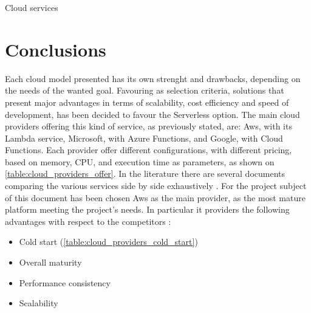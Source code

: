 \begin{chapter}{Cloud services}
    \section{Conclusions}
    Each cloud model presented has its own strenght and drawbacks, depending on the
    needs of the wanted goal. Favouring as selection criteria, solutions that present
    major advantages in terms of scalability, cost efficiency and speed of development,
    has been decided to favour the Serverless option.
    The main cloud providers offering this kind of service, as previously stated,
    are: Aws, with its Lambda service, Microsoft, with Azure Functions, and Google,
    with Cloud Functions. Each provider offer different configurations, with different
    pricing, based on memory, CPU, and execution time as parameters, as shown on
    \ref{table:cloud_providers_offer}.
    In the literature there are several documents comparing the various services
    side by side exhaustively \cite{sls_providers_comparison}.
    For the project subject of this document has been chosen Aws as the main provider,
    as the most mature platform meeting the project's needs. In particular it
    providers the following advantages with respect to the competitors \cite{sls_providers_comparison}:
    \begin{itemize}
        \item Cold start (\ref{table:cloud_providers_cold_start})
        \item Overall maturity
        \item Performance consistency
        \item Scalability
    \end{itemize}

    \begin{table}
        \centering
        \begin{tabularx}{0.8\textwidth}{
                | >{\raggedright\arraybackslash}X
                | >{\centering\arraybackslash}X
                | >{\centering\arraybackslash}X
                | >{\centering\arraybackslash}X |
            }


\end{tabularx}
\end{table}
\end{chapter}
